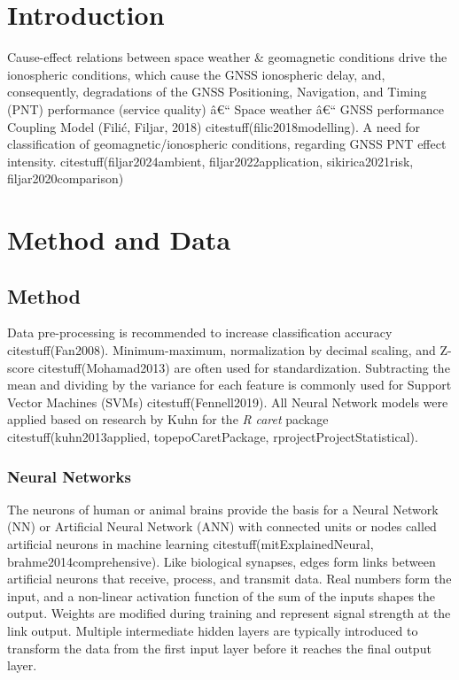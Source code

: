 \documentclass[preprint,12pt]{elsarticle}
\begin{document}
\section{Introduction}
Cause-effect relations between space weather \& geomagnetic conditions drive the ionospheric
conditions, which cause the GNSS ionospheric delay, and, consequently, degradations of the GNSS
Positioning, Navigation, and Timing (PNT) performance (service quality) â€“ Space weather â€“ GNSS
performance Coupling Model (Fili\'{c}, Filjar, 2018) citestuff(filic2018modelling).
A need for classification of geomagnetic/ionospheric conditions, regarding GNSS PNT effect
intensity.
citestuff(filjar2024ambient, filjar2022application, sikirica2021risk, filjar2020comparison)

\section{Method and Data}

\subsection{Method}

Data pre-processing is recommended to increase classification accuracy citestuff(Fan2008). Minimum-maximum, normalization by decimal scaling, and Z-score citestuff(Mohamad2013) are often used for standardization. Subtracting the mean and dividing by the variance for each feature is commonly used for Support Vector Machines (SVMs) citestuff(Fennell2019).
All Neural Network models were applied based on research by Kuhn for the \textit{R} \textit{caret} package citestuff(kuhn2013applied, topepoCaretPackage, rprojectProjectStatistical).

\subsubsection{Neural Networks}

The neurons of human or animal brains provide the basis for a Neural Network (NN) or Artificial Neural Network (ANN) with connected units or nodes called artificial neurons in machine learning citestuff(mitExplainedNeural, brahme2014comprehensive). Like biological synapses, edges form links between artificial neurons that receive, process, and transmit data. Real numbers form the input, and a non-linear activation function of the sum of the inputs shapes the output. Weights are modified during training and represent signal strength at the link output. Multiple intermediate hidden layers are typically introduced to transform the data from the first input layer before it reaches the final output layer. 
\end{document}
